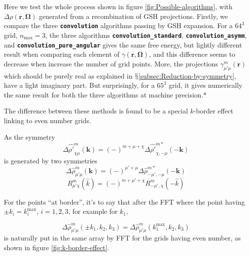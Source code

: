 Here we test the whole process shown in figure \ref{fig:Possible-algorithms},
with $\Delta\rho(\mathbf{r},\mathbf{\Omega})$ generated from a recombination
of \acs{GSH} projections. Firstly, we compare the three \texttt{\textbf{convolution}}
algorithms passing by \acs{GSH} expansion. For a $64^{3}$ grid,
$n_{\max}=3$, the three algorithms \texttt{\textbf{convolution\_standard}},
\texttt{\textbf{convolution\_asymm}}, and \texttt{\textbf{convolution\_pure\_angular}}
gives the same free energy, but lightly different result when comparing
each element of $\gamma(\mathbf{r},\mathbf{\Omega})$, and this difference
seems to decrease when increase the number of grid points. More, the
projections $\gamma_{\mu'\mu}^{m}(\mathbf{r})$ which should be purely
real as explained in $\mathsection$\ref{subsec:Reduction-by-symmetry},
have a light imaginary part. But surprisingly, for a $65^{3}$ grid,
it gives numerically the same result for both the three algorithms
at machine precision.{*} 

The difference between these methods is found to be a special $k$-border
effect linking to even number grids.

As the symmetry
\begin{equation}
\Delta\hat{\rho'}_{\chi\mu}^{m}(\mathbf{k})=(-)^{m+\mu+\chi}\Delta\hat{\rho'}_{\chi,-\mu}^{m*}(-\mathbf{k})\label{eq:2-1}
\end{equation}
 is generated by two symmetries
\begin{equation}
\Delta\hat{\rho}_{\mu'\mu}^{m}(\mathbf{k})=(-)^{\mu'+\mu}\Delta\hat{\rho}_{-\mu',-\mu}^{m*}(-\mathbf{k})\label{eq:1-1}
\end{equation}
\begin{equation}
R_{\mu'\chi}^{m}(\hat{k})=(-)^{m+\mu'+\chi}R_{-\mu',\chi}^{m}(-\hat{k})\label{eq:3-1}
\end{equation}

For the points ``at border'', it's to say that after the FFT where
the point having $\pm k_{i}=k_{i}^{\mathrm{max}}$, $i=1,2,3$, for
example for $k_{1},$

\[
\Delta\hat{\rho}_{\mu'\mu}^{m}(\pm k_{1},k_{2},k_{3})=\Delta\hat{\rho}_{\mu'\mu}^{m}(k_{1}^{\mathrm{max}},k_{2},k_{3})
\]
is naturally put in the same array by FFT for the grids having even
number, as shown in figure \ref{fig:k-border-effect}. 

